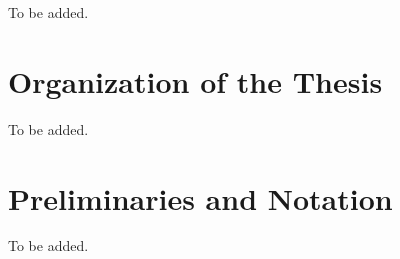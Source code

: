 \label{intro:chapter}

To be added.


\section{Organization of the Thesis}
To be added.


\section{Preliminaries and Notation}

To be added.

